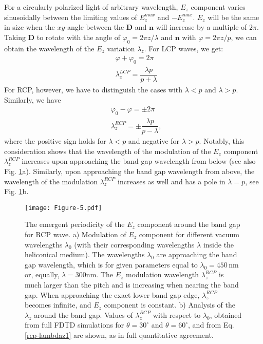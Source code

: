 \documentclass{osa-article}
\renewcommand{\vec}[1]{\mathbf{#1}}
\begin{document}
For a circularly polarized light of arbitrary wavelength, $E_z$ component varies sinusoidally between the limiting values of $E_z^{max}$ and $-E_z^{max}$. 
$E_z$ will be the same in size when the $xy$-angle between the $\vec{D}$ and $\vec{n}$ will increase by a multiple of $2 \pi$. 
Taking $\vec{D}$ to rotate with the angle of $\varphi_0=2\pi z/\lambda$ and $\vec{n}$ with $\varphi= 2\pi z /p $, we can obtain the wavelength of the $E_z$ variation $\lambda_z$. 
For LCP waves, we get:
\begin{align}
&\varphi+\varphi_0=2\pi \\
&\lambda_z^{LCP} = \dfrac{\lambda p}{p+\lambda}
\label{lcp-lambdaz}
\end{align}
For RCP, however, we have to distinguish the cases with $\lambda < p $ and $\lambda > p$. 
Similarly, we have
\begin{align}
&\varphi_0-\varphi= \pm 2\pi \\
&\lambda_z^{RCP} = \pm \dfrac{\lambda p}{p-\lambda},
\label{rcp-lambdaz1}
\end{align}
where the positive sign holds for $\lambda < p $ and negative for $\lambda > p$. 
Notably, this consideration shows that the wavelength of the modulation of the $E_z$ component $\lambda_z^{RCP}$ 
increases upon approaching the band gap wavelength from below (see also Fig. \ref{fig:Ez}a). 
Similarly, upon approaching the band gap wavelength from above, the wavelength of the modulation $\lambda_z^{RCP}$ increases as well and has a pole in $\lambda=p$, see Fig. \ref{fig:Ez}b. 


\begin{figure}[h!]
  \centering
  \texttt{[image: Figure-5.pdf]}
  \caption{The emergent periodicity of the $E_z$ component around the band gap for RCP wave.
  a) Modulation of $E_z$ component for different vacuum wavelengths $\lambda_0$ (with their corresponding wavelengths $\lambda$ inside the heliconical medium).
  The wavelengths $\lambda_0$ are approaching the band gap wavelength, which is for given parameters equal to $\lambda_0=450\,\mathrm{nm}$ or, equally, $\lambda=300\mathrm{nm}$.
  The $E_z$ modulation wavelength $\lambda_z^{RCP}$ is much larger than the pitch and is increasing when nearing the band gap.
  When approaching the exact lower band gap edge, $\lambda_z^{RCP}$ becomes infinite, and $E_z$ component is constant. 
  b) Analysis of the $\lambda_z$ around the band gap. 
  Values of $\lambda_z^{RCP}$ with respect to $\lambda_0$, obtained from full FDTD simulations for $\theta=30^\circ$ and $\theta=60^\circ$, 
  and from Eq. \ref{rcp-lambdaz1} are shown, as in full quantitative agreement. 
  }
  \label{fig:Ez}
\end{figure}
\end{document}
